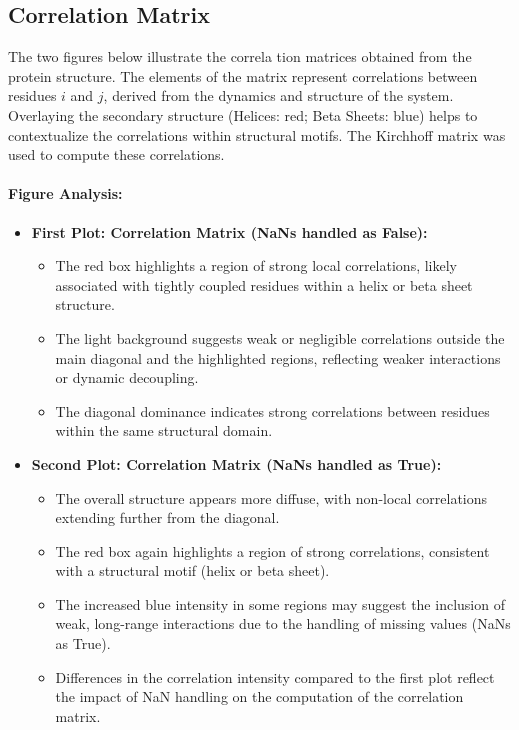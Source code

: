 \documentclass[English, Lau, oneside]{sapthesis}
\begin{document}
\begin{itemize}
\section*{Correlation Matrix}
The two figures below illustrate the correla    tion matrices obtained from the protein structure. The elements of the matrix represent correlations between residues \(i\) and \(j\), derived from the dynamics and structure of the system. Overlaying the secondary structure (Helices: red; Beta Sheets: blue) helps to contextualize the correlations within structural motifs. The Kirchhoff matrix was used to compute these correlations.

\paragraph{Figure Analysis:}

\begin{itemize}
    \item \textbf{First Plot: Correlation Matrix (NaNs handled as False):}
    \begin{itemize}
        \item The red box highlights a region of strong local correlations, likely associated with tightly coupled residues within a helix or beta sheet structure.
        \item The light background suggests weak or negligible correlations outside the main diagonal and the highlighted regions, reflecting weaker interactions or dynamic decoupling.
        \item The diagonal dominance indicates strong correlations between residues within the same structural domain.
    \end{itemize}

    \item \textbf{Second Plot: Correlation Matrix (NaNs handled as True):}
    \begin{itemize}
        \item The overall structure appears more diffuse, with non-local correlations extending further from the diagonal.
        \item The red box again highlights a region of strong correlations, consistent with a structural motif (helix or beta sheet).
        \item The increased blue intensity in some regions may suggest the inclusion of weak, long-range interactions due to the handling of missing values (NaNs as True).
        \item Differences in the correlation intensity compared to the first plot reflect the impact of NaN handling on the computation of the correlation matrix.
    \end{itemize}
\end{itemize}


\end{itemize}
\end{document}
